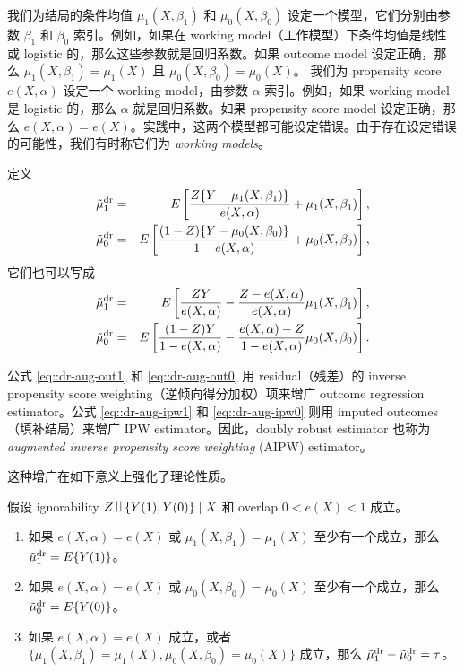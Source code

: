 我们为结局的条件均值 $\mu_1(X, \beta_1)$ 和 $\mu_0(X, \beta_0)$ 设定一个模型，它们分别由参数 $\beta_1$ 和 $\beta_0$ 索引。例如，如果在 working model（工作模型）下条件均值是线性或 logistic 的，那么这些参数就是回归系数。如果 outcome model 设定正确，那么 $\mu_1(X, \beta_1) = \mu_1(X)$ 且 $   \mu_0(X, \beta_0) = \mu_0(X)$。
我们为 propensity score $e(X, \alpha)$ 设定一个 working model，由参数 $\alpha$ 索引。例如，如果 working model 是 logistic 的，那么 $\alpha$ 就是回归系数。如果 propensity score model 设定正确，那么 $e(X,\alpha) = e(X)$。实践中，这两个模型都可能设定错误。由于存在设定错误的可能性，我们有时称它们为 {\it working models}。

定义
\begin{eqnarray}
\tilde{\mu}_1^\textup{dr} &=& E\left[   \frac{Z\{ Y-\mu_1(X,\beta_1) \}}{  e(X,\alpha) }   + \mu_1(X, \beta_1)  \right] , \label{eq::dr-aug-out1}   \\
\tilde{\mu}_0^\textup{dr} &=& E\left[   \frac{(1-Z)\{ Y-\mu_0(X,\beta_0) \}}{  1-e(X,\alpha) }   + \mu_0(X, \beta_0)  \right]  , \label{eq::dr-aug-out0} 
\end{eqnarray}
它们也可以写成
\begin{eqnarray}
\tilde{\mu}_1^\textup{dr} &=& E\left[   \frac{Z Y}{  e(X,\alpha) }   - \frac{  Z -  e(X,\alpha)  }{ e(X,\alpha) } \mu_1(X, \beta_1)  \right]  ,\label{eq::dr-aug-ipw1} \\
\tilde{\mu}_0^\textup{dr} &=& E\left[   \frac{(1-Z) Y}{  1-e(X,\alpha) }    - \frac{ e(X,\alpha)-Z  }{1- e(X,\alpha)} \mu_0(X, \beta_0)  \right]    .\label{eq::dr-aug-ipw0} 
\end{eqnarray}
 
公式 \eqref{eq::dr-aug-out1} 和 \eqref{eq::dr-aug-out0} 用 residual（残差）的 inverse propensity score weighting（逆倾向得分加权）项来增广 outcome regression estimator。公式 \eqref{eq::dr-aug-ipw1} 和 \eqref{eq::dr-aug-ipw0} 则用 imputed outcomes（填补结局）来增广 IPW estimator。因此，doubly robust estimator 也称为 {\it augmented inverse propensity score weighting} (AIPW) estimator。



这种增广在如下意义上强化了理论性质。
 
 


\begin{theorem}
\label{thm::doublyrobust}
假设 ignorability $Z \ind  \{  Y(1), Y(0) \} \mid X$ 和 overlap $0 < e(X) < 1$ 成立。
\begin{enumerate}
\item
如果 $e(X,\alpha) = e(X)$ 或 $\mu_1(X, \beta_1) = \mu_1(X)$ 至少有一个成立，那么 $\tilde{\mu}_1^\textup{dr} = E\{  Y(1) \}$。
\item 
如果 $e(X,\alpha) = e(X)$ 或 $\mu_0(X, \beta_0) = \mu_0(X)$ 至少有一个成立，那么 $\tilde{\mu}_0^\textup{dr} = E\{  Y(0) \}$。
\item 
如果 $e(X,\alpha) = e(X)$ 成立，或者 $\{\mu_1(X, \beta_1) = \mu_1(X),   \mu_0(X, \beta_0) = \mu_0(X)\}$ 成立，那么 $\tilde{\mu}_1^\textup{dr} - \tilde{\mu}_0^\textup{dr} = \tau$。
\end{enumerate}
\end{theorem}


